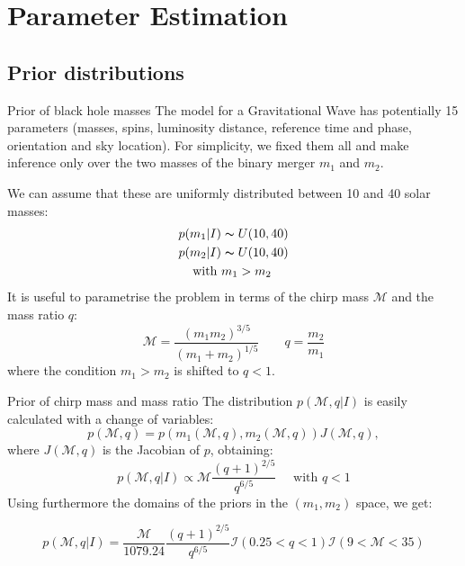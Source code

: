\documentclass[
10pt,
aspectratio=169,
]{beamer}
\begin{document}
\section{Parameter Estimation}

\subsection{Prior distributions}
\begin{frame}{Prior of black hole masses}
The model for a Gravitational Wave has potentially 15 parameters (masses, spins, luminosity distance, reference
time and phase, orientation and sky location).
\vfill
For simplicity, we fixed them all and make inference only over the two masses of the binary merger $m_1$ and $m_2$.

We can assume that these are uniformly distributed between 10 and 40 solar masses:
\begin{align}
    p(m_1|I) &\thicksim U(10,40)\\
    p(m_2|I) &\thicksim U(10,40)\\
    \text{with }& m_1 > m_2
\end{align}
It is useful to parametrise the problem in terms of the chirp mass $\mathcal{M}$ and the mass ratio $q$:
\[
    \mathcal{M}=\frac{(m_1 m_2)^{3/5}}{(m_1+m_2)^{1/5}} \qquad
    q=\frac{m_2}{m_1}
\]
where the condition $m_1>m_2$ is shifted to $q<1$.
\end{frame}
\begin{frame}{Prior of chirp mass and mass ratio}
The distribution $p(\mathcal{M},q|I)$ is easily calculated with a change of variables:
\begin{equation}
    p(\mathcal{M},q) = p(m_1(\mathcal{M},q),m_2(\mathcal{M},q))J(\mathcal{M},q),
\end{equation}
 where $J(\mathcal{M},q)$ is the Jacobian of $p$, obtaining:
 \begin{equation}
     p(\mathcal{M},q|I) \propto \mathcal{M}\frac{(q+1)^{2/5}}{q^{6/5}} \quad \text{ with } q<1
 \end{equation}
 Using furthermore the domains of the priors in the $(m_1,m_2)$ space, we get:
 
 \begin{equation}
     p(\mathcal{M},q|I) = \frac{\mathcal{M}}{1079.24}\frac{(q+1)^{2/5}}{q^{6/5}}\mathcal{I}(0.25<q<1)\mathcal{I}(9<\mathcal{M}<35)
 \end{equation}
 
\end{frame}
\end{document}
